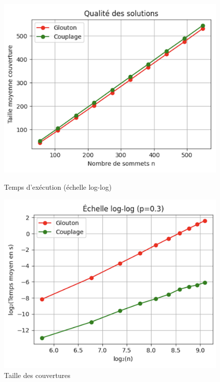 \documentclass[11pt,a4paper]{article}
\begin{document}
\begin{figure}[H]
    \centering
    \begin{minipage}{0.49\textwidth}
        \centering
        \includegraphics[width=\textwidth]{courbes_temps.png}
        \caption{Temps d'exécution (échelle log-log)}
    \end{minipage}
    \hfill
    \begin{minipage}{0.49\textwidth}
        \centering
        \includegraphics[width=\textwidth]{comparaison_couvertures.png}
        \caption{Taille des couvertures}
    \end{minipage}
    \label{fig:exp_comparaison}
\end{figure}
\end{document}
